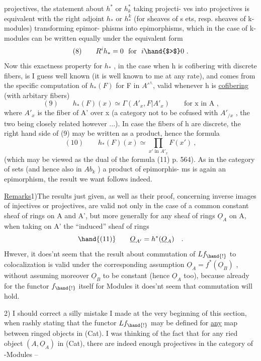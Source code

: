 projectives,  the statement about  $h^{*}$ or $h^{*}_{k}$ taking projecti-%
ves into projectives is equivalent with the right adjoint $h_{*}$ or $h^{k}_{*}$
(for sheaves of s ets,  resp. sheaves of k-modules) transforming epimor-%
phisms into epimorphisms,  which in the case of k-modules can be
written equally under the equivalent form
\[ (8) \qquad R^{i}h_{*} = 0 \ \text{ for } \ i \hand{$>$} 0 \ . \]
Now this exactness property for $h_{*}$ ,  in the case when h is cofibering
with discrete fibers, is I guess well known (it is well known to me
at any rate),  and comes from the specific computation of $h_{*}(F)$ for
F in $A'^{\wedge}$,  valid whenever h is \uline{cofibering} (with arbitary fibers)
\[ (9) \qquad h_{*}(F)(x) \simeq \Gamma(A'_{x}, F|A'_{x}) \qquad \text{for x in A ,} \]
where $A'_{x}$ is the fiber of A' over x (a category not to be cofused with
$A'_{/x}$ ,  the two being closely related however ...).  In case the fibers
of h are discrete,  the right hand side of (9) may be written as a
product,  hence the formula
\[ (10) \qquad h_{*}(F)(x) \simeq \prod_{x' \text{ in } A'_{x}} F(x') \ , \]
(which may be viewed as the dual of the formula (11) p. 564).  As in
the category of sets (and hence also in  $Ab_{k}$ ) a product of epimorphis-%
ms is again an epimorphism,  the result we want follows indeed.

\uline{Remarks}1)The results just given,  as well as their proof,  concerning
inverse images of injectives or projectives,  are valid not only in
the case of a  common constant sheaf of rings on A and
A',  but more generally for any sheaf of rings $\underline{O}_{A}$ on A,  when taking
on A' the ``induced'' sheaf of rings
\[ \hand{(11)} \qquad \underline{O}_{A'} = h^{*}(\underline{O}_{A}) \quad . \]
Hwever,  it does'nt seem that the result about commutation of $Lf_{\hand{!}}$
to colocalization is valid under the corresponding assumption
$\underline{O}_{A} = f^{*}(\underline{O}_{B})$ ,  without assuming moreover $\underline{O}_{B}$  to be constant
(hence $\underline{O}_{A}$ too),  because already for the functor $f_{\hand{!}}$ itself for M\hand{\u{}}odules\hand{,}
it does'nt seem that commutation will hold.

2)  I should correct a silly mistake I made at the very beginning
of this section,  when rashly stating that the functor $Lf_{\hand{!}}$  may be
defined for \uline{any} map between ringed objects in (Cat).  I was thinking
of the fact that for any ried object $(A,\underline{O}_{A})$  in (Cat),  there are
indeed enough projectives in the category of -Modules  --
